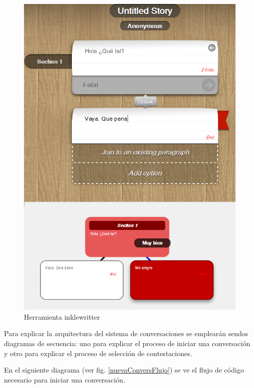 \begin{figure}[H]
\begin{center}
\includegraphics[scale=0.7]{imagenes/inklewritter.png}
\caption{Herramienta inklewritter}
\label{inklewritter}
\end{center}
\end{figure}

Para explicar la arquitectura del sistema de conversaciones se emplearán sendos diagramas de secuencia: uno para explicar el proceso de iniciar una conversación y otro para explicar el proceso de selección de contestaciones.

En el siguiente diagrama (ver fig. \ref{nuevaConversFlujo}) se ve el flujo de código necesario para iniciar una conversación. 

